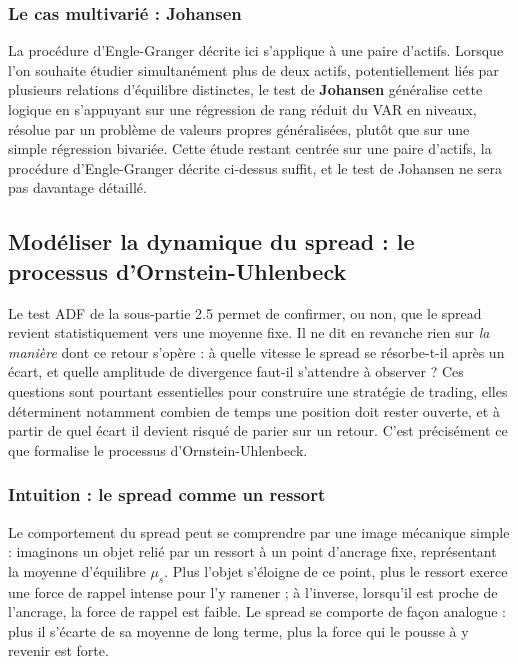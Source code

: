 \documentclass{article}
\begin{document}
\subsubsection*{Le cas multivarié : Johansen}
La procédure d'Engle-Granger décrite ici s'applique à une paire d'actifs. Lorsque l'on souhaite étudier simultanément plus de deux actifs, potentiellement liés par plusieurs relations d'équilibre distinctes, le test de \textbf{Johansen} généralise cette logique en s'appuyant sur une régression de rang réduit du VAR en niveaux, résolue par un problème de valeurs propres généralisées, plutôt que sur une simple régression bivariée. Cette étude restant centrée sur une paire d'actifs, la procédure d'Engle-Granger décrite ci-dessus suffit, et le test de Johansen ne sera pas davantage détaillé.
\subsection{Modéliser la dynamique du spread : le processus d'Ornstein-Uhlenbeck}
Le test ADF de la sous-partie 2.5 permet de confirmer, ou non, que le spread revient statistiquement vers une moyenne fixe. Il ne dit en revanche rien sur \emph{la manière} dont ce retour s'opère : à quelle vitesse le spread se résorbe-t-il après un écart, et quelle amplitude de divergence faut-il s'attendre à observer ? Ces questions sont pourtant essentielles pour construire une stratégie de trading, elles déterminent notamment combien de temps une position doit rester ouverte, et à partir de quel écart il devient risqué de parier sur un retour. C'est précisément ce que formalise le processus d'Ornstein-Uhlenbeck.
\subsubsection*{Intuition : le spread comme un ressort}
Le comportement du spread peut se comprendre par une image mécanique simple : imaginons un objet relié par un ressort à un point d'ancrage fixe, représentant la moyenne d'équilibre $\mu_s$. Plus l'objet s'éloigne de ce point, plus le ressort exerce une force de rappel intense pour l'y ramener ; à l'inverse, lorsqu'il est proche de l'ancrage, la force de rappel est faible. Le spread se comporte de façon analogue : plus il s'écarte de sa moyenne de long terme, plus la force qui le pousse à y revenir est forte.
\end{document}

